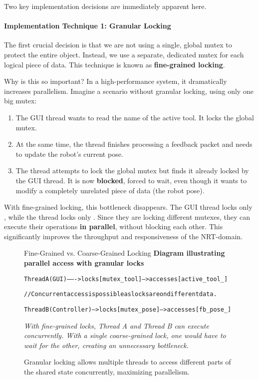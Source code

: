 Two key implementation decisions are immediately apparent here.

\paragraph{Implementation Technique 1: Granular Locking}
The first crucial decision is that we are not using a single, global mutex to protect the entire  object. Instead, we use a separate, dedicated mutex for each logical piece of data. This technique is known as \textbf{fine-grained locking}.

Why is this so important? In a high-performance system, it dramatically increases parallelism. Imagine a scenario without granular locking, using only one big mutex:
\begin{enumerate}
    \item The GUI thread wants to read the name of the active tool. It locks the global mutex.
    \item At the same time, the  thread finishes processing a feedback packet and needs to update the robot's current pose.
    \item The  thread attempts to lock the global mutex but finds it already locked by the GUI thread. It is now \textbf{blocked}, forced to wait, even though it wants to modify a completely unrelated piece of data (the robot pose).
\end{enumerate}

With fine-grained locking, this bottleneck disappears. The GUI thread locks only , while the  thread locks only . Since they are locking different mutexes, they can execute their operations \textbf{in parallel}, without blocking each other. This significantly improves the throughput and responsiveness of the NRT-domain.

\begin{figure}[h!]
    \centering
    \begin{infobox}{Fine-Grained vs. Coarse-Grained Locking}
        \textbf{Diagram illustrating parallel access with granular locks}
        {\footnotesize
        \begin{alltt}
Thread A (GUI) -------> locks [mutex_tool] --> accesses [active_tool_]

  // Concurrent access is possible as locks are on different data.

Thread B (Controller) --> locks [mutex_pose] --> accesses [fb_pose_]
        \end{alltt}
        }

        \textit{With fine-grained locks, Thread A and Thread B can execute concurrently. With a single coarse-grained lock, one would have to wait for the other, creating an unnecessary bottleneck.}
    \end{infobox}
            \vspace{0.3cm}
    \caption{Granular locking allows multiple threads to access different parts of the shared state concurrently, maximizing parallelism.}
    \label{fig:granular_locking}
\end{figure}

